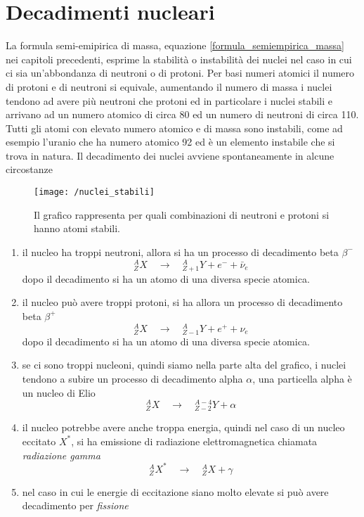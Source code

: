 
\section{Decadimenti nucleari}
La formula semi-emipirica di massa, equazione \ref{formula_semiempirica_massa} nei capitoli precedenti, esprime la stabilità o instabilità dei nuclei nel caso in cui ci sia un'abbondanza di neutroni o di protoni.
Per basi numeri atomici il numero di protoni e di neutroni si equivale, aumentando il numero di massa i nuclei tendono ad avere più neutroni che protoni ed in particolare i nuclei stabili e arrivano ad un numero atomico di circa 80 ed un numero di neutroni di circa 110.
Tutti gli atomi con elevato numero atomico e di massa sono instabili, come ad esempio l'uranio che ha numero atomico 92 ed è un elemento instabile che si trova in natura.
Il decadimento dei nuclei avviene spontaneamente in alcune circostanze
\begin{figure}[h]
\centering
\texttt{[image: /nuclei\_stabili]}
\caption{Il grafico rappresenta per quali combinazioni di neutroni e protoni si hanno atomi stabili.}
\end{figure}
\begin{enumerate}
\item  il nucleo ha troppi neutroni, allora si ha un processo di decadimento beta $\beta^-$
\begin{equation}
^{A}_{Z}X \quad\longrightarrow\quad  ^{A}_{Z+1}Y + e^- + \bar\nu_e
\end{equation}
dopo il decadimento si ha un atomo di una diversa specie atomica.
\item il nucleo può avere troppi protoni, si ha allora un processo di decadimento beta $\beta^+$
\begin{equation}
^{A}_{Z}X \quad\longrightarrow\quad ^{A}_{Z-1}Y + e^+ + \nu_e
\end{equation}
dopo il decadimento si ha un atomo di una diversa specie atomica.
\item se ci sono troppi nucleoni, quindi siamo nella parte alta del grafico, i nuclei tendono a subire un processo di decadimento alpha $\alpha$, una particella alpha è un nucleo di Elio
\begin{equation}
^{A}_{Z}X \quad\longrightarrow\quad ^{A-4}_{Z-2}Y + \alpha
\end{equation}
\item il nucleo potrebbe avere anche troppa energia, quindi nel caso di un nucleo eccitato $X^{\ast}$, si ha emissione di radiazione elettromagnetica chiamata \emph{radiazione gamma}
\begin{equation}
^{A}_{Z}X^{\ast} \quad\longrightarrow\quad ^{A}_{Z}X + \gamma
\end{equation}
\item nel caso in cui le energie di eccitazione siano molto elevate si può avere decadimento per \emph{fissione} 
\end{enumerate}
